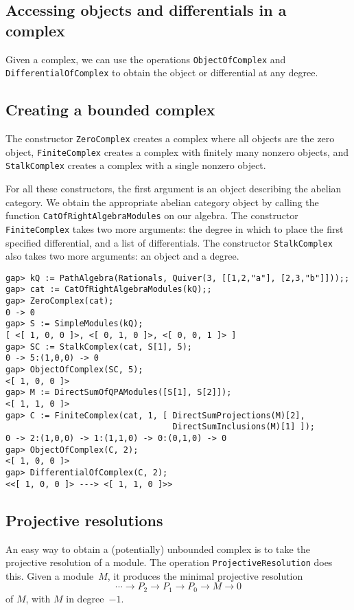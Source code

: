 \documentclass{amsart}
\theoremstyle{definition}
\newcommand{\code}[1]{\texttt{#1}}
\theoremstyle{theoretic}
\begin{document}
\subsection{Accessing objects and differentials in a complex}

Given a complex, we can use the operations \code{ObjectOfComplex} and
\code{DifferentialOfComplex} to obtain the object or differential at
any degree.

\subsection{Creating a bounded complex}

The constructor \code{ZeroComplex} creates a complex where all objects
are the zero object, \code{FiniteComplex} creates a complex with
finitely many nonzero objects, and \code{StalkComplex} creates a
complex with a single nonzero object.

For all these constructors, the first argument is an object describing
the abelian category.  We obtain the appropriate abelian category
object by calling the function \code{CatOfRightAlgebraModules} on our
algebra.  The constructor \code{FiniteComplex} takes two more
arguments: the degree in which to place the first specified
differential, and a list of differentials.  The constructor
\code{StalkComplex} also takes two more arguments: an object and a
degree.

\begin{verbatim}
gap> kQ := PathAlgebra(Rationals, Quiver(3, [[1,2,"a"], [2,3,"b"]]));;
gap> cat := CatOfRightAlgebraModules(kQ);;
gap> ZeroComplex(cat);
0 -> 0
gap> S := SimpleModules(kQ);
[ <[ 1, 0, 0 ]>, <[ 0, 1, 0 ]>, <[ 0, 0, 1 ]> ]
gap> SC := StalkComplex(cat, S[1], 5);
0 -> 5:(1,0,0) -> 0
gap> ObjectOfComplex(SC, 5);
<[ 1, 0, 0 ]>
gap> M := DirectSumOfQPAModules([S[1], S[2]]);
<[ 1, 1, 0 ]>
gap> C := FiniteComplex(cat, 1, [ DirectSumProjections(M)[2],
                                  DirectSumInclusions(M)[1] ]);
0 -> 2:(1,0,0) -> 1:(1,1,0) -> 0:(0,1,0) -> 0
gap> ObjectOfComplex(C, 2);
<[ 1, 0, 0 ]>
gap> DifferentialOfComplex(C, 2);
<<[ 1, 0, 0 ]> ---> <[ 1, 1, 0 ]>>
\end{verbatim}

\subsection{Projective resolutions}

An easy way to obtain a (potentially) unbounded complex is to take the
projective resolution of a module.  The operation
\code{ProjectiveResolution} does this.  Given a module~$M$, it
produces the minimal projective resolution
\[
\cdots \to P_2 \to P_1 \to P_0 \to M \to 0
\]
of $M$, with $M$ in degree~$-1$.
\end{document}
